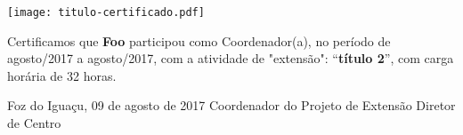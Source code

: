 \documentclass[a4paper,brazil]{article}%
\begin{document}
%
\normalsize%

\pagestyle{empty}
\BgThispage
%
\vspace*{2cm}%
\begin{flushright}%
\texttt{[image: titulo-certificado.pdf]}%
\linebreak%
\end{flushright}%
\vspace*{-1cm}%
\Large%
%


        Certificamos que \textbf{Foo} participou como Coordenador(a), no período de agosto/2017 a agosto/2017, com a atividade de "extensão": ``\textbf{título 2}'', com carga horária de 32 horas.

\vspace*{1.5cm}%
\hspace*{7cm}%
\begin{minipage}{\widthof{Foz do Iguaçu, 09 de agosto de 2017}}%
\begin{center}%
Foz do Iguaçu, 09 de agosto de 2017%
\newline%
\newline%
\newline%
Coordenador do Projeto de Extensão%
\newline%
\newline%
\newline%
Diretor de Centro%
\end{center}%
\end{minipage}%
\end{document}
